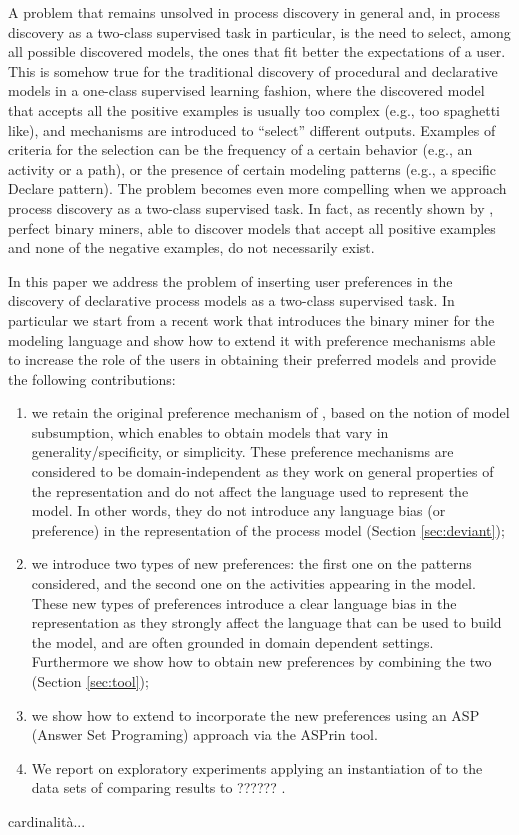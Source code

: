 A problem that remains unsolved in process discovery in general and, in process discovery as a two-class supervised task in particular, is the need to select, among all possible discovered models, the ones that fit better the expectations of a user. This is somehow true for the traditional discovery of procedural and declarative models in a one-class supervised learning fashion, where the discovered model that accepts all the positive examples is usually too complex (e.g., too spaghetti like), and mechanisms are introduced to ``select'' different outputs. Examples of criteria for the selection can be the frequency of a certain behavior (e.g., an activity or a path), or the presence of certain modeling patterns (e.g., a specific Declare pattern).   
The problem becomes even more compelling when we approach process discovery as a two-class supervised task. In fact, as recently shown by \cite{DBLP:conf/bpm/SlaatsDB21}, perfect binary miners, able to discover models that accept all positive examples and none of the negative examples, do not necessarily exist.  
 
In this paper we address the problem of inserting user preferences in the discovery of declarative process models  as a two-class supervised task. In particular we start from a recent work \cite{deviant-arxiv} that introduces the \nd binary miner for the \declare \cite{2009-Aalst} modeling language and show how to extend it with preference mechanisms able to increase the role of the users in obtaining their preferred models and provide the following contributions: 
\begin{enumerate}[{(i)}]
	\item we retain the original preference mechanism of \nd, based on the notion of model subsumption, which enables to obtain models that vary in generality/specificity, or simplicity. These preference mechanisms are considered to be domain-independent as they work on general properties of the representation and do not affect the language used to represent the model. In other words, they do not introduce any language bias (or preference) in the representation of the process model (Section \ref{sec:deviant});
	\item we introduce two types of new preferences: the first one on the \declare patterns considered, and the second one on the activities appearing in the model. These new types of preferences introduce a clear language bias in the representation as they strongly affect the language that can be used to build the model, and are often grounded in domain dependent settings. Furthermore we show how to obtain new preferences by combining the two (Section \ref{sec:tool}); 
	\item we show how to extend \nd to incorporate the new preferences using an ASP (Answer Set Programing) approach via the ASPrin tool.   
	\item We report on exploratory experiments applying an instantiation of \nd  to the data sets of \cite{DBLP:conf/bpm/SlaatsDB21} comparing results to ?????? .
\end{enumerate}


cardinalità...